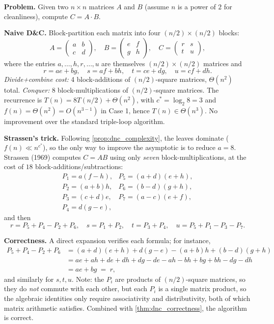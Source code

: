 \begin{example}
\label{ex:strassen}
\textbf{Problem.} Given two $n \times n$ matrices $A$ and $B$ (assume $n$ is a power of $2$ for cleanliness), compute $C = A \cdot B$.

\medskip
\noindent\textbf{Naive D\&C.} Block-partition each matrix into four $(n/2) \times (n/2)$ blocks:
\[
  A = \begin{pmatrix} a & b \\ c & d \end{pmatrix},\quad
  B = \begin{pmatrix} e & f \\ g & h \end{pmatrix},\quad
  C = \begin{pmatrix} r & s \\ t & u \end{pmatrix},
\]
where the entries $a, \dots, h, r, \dots, u$ are themselves $(n/2) \times (n/2)$ matrices and
\[
  r = ae + bg,\quad s = af + bh,\quad t = ce + dg,\quad u = cf + dh.
\]
\textit{Divide+combine cost:} 4 block-additions of $(n/2)$-square matrices, $\Theta(n^2)$ total. \textit{Conquer:} 8 block-multiplications of $(n/2)$-square matrices. The recurrence is $T(n) = 8 T(n/2) + \Theta(n^2)$, with $c^* = \log_2 8 = 3$ and $f(n) = \Theta(n^2) = O(n^{3-1})$ in Case 1, hence $T(n) \in \Theta(n^3)$. No improvement over the standard triple-loop algorithm.

\medskip
\noindent\textbf{Strassen's trick.} Following \cref{prop:dnc_complexity}, the leaves dominate ($f(n) \ll n^{c^*}$), so the only way to improve the asymptotic is to reduce $a = 8$. Strassen (1969) computes $C = AB$ using only \emph{seven} block-multiplications, at the cost of $18$ block-additions/subtractions:
\[
  \begin{array}{ll}
    P_1 = a (f - h),         & P_5 = (a + d)(e + h), \\
    P_2 = (a + b) h,         & P_6 = (b - d)(g + h), \\
    P_3 = (c + d) e,         & P_7 = (a - c)(e + f), \\
    P_4 = d (g - e),         &
  \end{array}
\]
and then
\[
  r = P_5 + P_4 - P_2 + P_6,\quad s = P_1 + P_2,\quad t = P_3 + P_4,\quad u = P_5 + P_1 - P_3 - P_7.
\]

\medskip
\noindent\textbf{Correctness.} A direct expansion verifies each formula; for instance,
\begin{align*}
  P_5 + P_4 - P_2 + P_6
  &= (a+d)(e+h) + d(g-e) - (a+b)h + (b-d)(g+h) \\
  &= ae + ah + de + dh + dg - de - ah - bh + bg + bh - dg - dh \\
  &= ae + bg \;=\; r,
\end{align*}
and similarly for $s, t, u$. Note: the $P_i$ are products of $(n/2)$-square matrices, so they do \emph{not} commute with each other, but each $P_i$ is a single matrix product, so the algebraic identities only require associativity and distributivity, both of which matrix arithmetic satisfies. Combined with \cref{thm:dnc_correctness}, the algorithm is correct.


\end{example}
